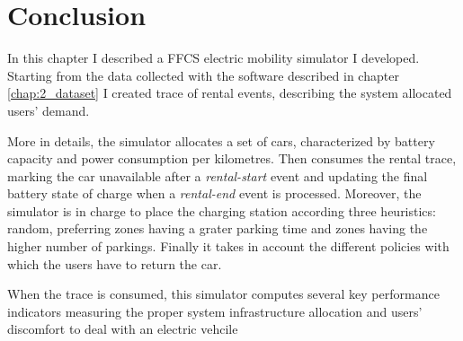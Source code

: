 \section{Conclusion}\label{key}
\label{sec:5_6_conclusion}
In this chapter I described a FFCS electric mobility simulator I developed. Starting from the data collected with the software described in chapter \ref{chap:2_dataset} I created trace of rental events, describing the system allocated users' demand. 

More in details, the simulator allocates a set of cars, characterized by battery capacity and power consumption per kilometres. Then consumes the rental trace, marking the car unavailable after a \textit{rental-start} event and updating the final battery state of charge when a \textit{rental-end} event is processed. Moreover, the simulator is in charge to place the charging station according three heuristics: random, preferring zones having a grater parking time and zones having the higher number of parkings. Finally it takes in account the different policies with which the users have to return the car.

When the trace is consumed, this simulator computes several key performance indicators measuring the proper system infrastructure allocation and users' discomfort to deal with an electric vehcile